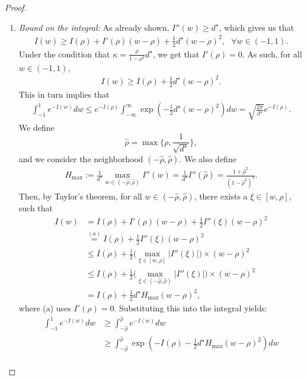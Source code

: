 \documentclass[12pt]{article}
\theoremstyle{definition}
\theoremstyle{remark}
\begin{document}
\begin{proof}
\begin{enumerate}
\item \textit{Bound on the integral:} As already shown, $I''(w) \geq d^\star$, which gives us that
\begin{align*}
    I(w) \geq I(\rho) + I'(\rho)(w-\rho) + \frac{1}{2} d^\star (w-\rho)^2, \ \ \ \forall w\in(-1,1).
\end{align*}
Under the condition that $\kappa=\frac{\rho}{1-\rho^2}d^{\star}$, we get that $I'(\rho) = 0$. As such, for all $w\in(-1,1)$,
\begin{align}
\label{eq:Iw_lower_bound}
    I(w) \geq I(\rho) + \frac{1}{2} d^\star (w-\rho)^2.
\end{align}
This in turn implies that
\begin{align*}
    \int_{-1}^1 e^{-I(w)} dw \leq e^{-I(\rho)} \int_{-\infty}^\infty \exp\left(-\frac{1}{2} d^\star (w-\rho)^2\right) dw = \sqrt{\frac{2\pi}{d^\star}}e^{-I(\rho)}.
\end{align*}
We define
\begin{equation*}
    \hat{\rho} = \max \Big\{ \rho , \frac{1}{\sqrt{d^\star}} \Big\},
\end{equation*}
and we consider the neighborhood $(-\hat{\rho}, \hat{\rho})$. We also define
\begin{align*}
    H_{\max} := \frac{1}{d^\star}\max_{w \in (-\hat{\rho}, \hat{\rho})} I''(w) = \frac{1}{d^\star} I''(\hat \rho) = \frac{1+\hat \rho^2}{(1-\hat \rho^2)^2}.
\end{align*}
Then, by Taylor's theorem, for all $w\in (-\hat{\rho}, \hat{\rho})$, there exists a $\xi \in [w,\rho]$, such that
\begin{align*}
    I(w) &= I(\rho) + I'(\rho)(w-\rho) + \frac{1}{2} I''(\xi) (w-\rho)^2\\
    & \stackrel{(a)}{=}I(\rho) + \frac{1}{2} I''(\xi) (w-\rho)^2\\
    & \leq I(\rho) + \frac{1}{2} \Big( \max_{\xi \in [w,\rho]}|I''(\xi)| \Big) \times (w-\rho)^2\\
    &\leq I(\rho) + \frac{1}{2} \Big( \max_{\xi \in (-\hat{\rho}, \hat{\rho})}|I''(\xi)| \Big) \times (w-\rho)^2\\
    & = I(\rho) + \frac{1}{2} d^\star H_{\max} (w-\rho)^2,
\end{align*}
where (a) uses $I'(\rho) = 0$. Substituting this into the integral yields:
\begin{align*}
\int_{-1}^1 e^{-I(w)} dw &\ge \int_{- \hat \rho }^{\hat \rho} e^{-I(w)}   dw\\
&\geq \int_{- \hat \rho }^{\hat \rho} \exp\left(-I(\rho) -\frac{1}{2} d^\star H_{\max} (w-\rho)^2\right) dw\\

\end{align*}
\end{enumerate}
\end{proof}
\end{document}
